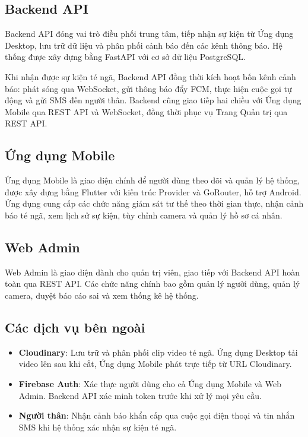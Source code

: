 \subsection{Backend API}

Backend API đóng vai trò điều phối trung tâm, tiếp nhận sự kiện từ Ứng dụng Desktop, lưu
trữ dữ liệu và phân phối cảnh báo đến các kênh thông báo. Hệ thống được xây dựng bằng
FastAPI với cơ sở dữ liệu PostgreSQL.

Khi nhận được sự kiện té ngã, Backend API đồng thời kích hoạt bốn kênh cảnh báo: phát
sóng qua WebSocket, gửi thông báo đẩy FCM, thực hiện cuộc gọi tự động và gửi SMS đến
người thân. Backend cũng giao tiếp hai chiều với Ứng dụng Mobile qua REST API và WebSocket,
đồng thời phục vụ Trang Quản trị qua REST API.

\subsection{Ứng dụng Mobile}

Ứng dụng Mobile là giao diện chính để người dùng theo dõi và quản lý hệ thống, được xây
dựng bằng Flutter với kiến trúc Provider và GoRouter, hỗ trợ Android. Ứng dụng cung cấp
các chức năng giám sát tư thế theo thời gian thực, nhận cảnh báo té ngã, xem lịch sử sự
kiện, tùy chỉnh camera và quản lý hồ sơ cá nhân.

\subsection{Web Admin}

Web Admin là giao diện dành cho quản trị viên, giao tiếp với Backend API hoàn toàn
qua REST API. Các chức năng chính bao gồm quản lý người dùng, quản lý camera, duyệt báo
cáo sai và xem thống kê hệ thống.

\subsection{Các dịch vụ bên ngoài}

\begin{itemize}[leftmargin=1.5cm]
  \item \textbf{Cloudinary}: Lưu trữ và phân phối clip video té ngã. Ứng dụng Desktop tải
        video lên sau khi cắt, Ứng dụng Mobile phát trực tiếp từ URL Cloudinary.
  \item \textbf{Firebase Auth}: Xác thực người dùng cho cả Ứng dụng Mobile và Web Admin.
        Backend API xác minh token trước khi xử lý mọi yêu cầu.
  \item \textbf{Người thân}: Nhận cảnh báo khẩn cấp qua cuộc gọi điện thoại và tin nhắn
        SMS khi hệ thống xác nhận sự kiện té ngã.
\end{itemize}

